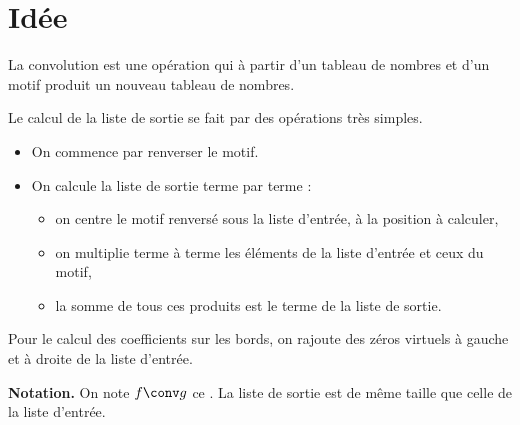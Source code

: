 \documentclass[11pt,class=report,crop=false]{standalone}
\begin{document}




\section{Idée}


La convolution est une opération qui à partir d'un tableau de nombres et d'un motif produit un nouveau tableau de nombres.



Le calcul de la liste de sortie se fait par des opérations très simples.
\begin{itemize}
  \item On commence par renverser le motif.
  
  \smallskip
  
  
  \item On calcule la liste de sortie terme par terme :
  \begin{itemize}
    \item on centre le motif renversé sous la liste d'entrée, à la position à calculer,
    \item on multiplie terme à terme les éléments de la liste d'entrée et ceux du motif,
    \item la somme de tous ces produits est le terme de la liste de sortie.
  \end{itemize}
\end{itemize}






Pour le calcul des coefficients sur les bords, on rajoute des zéros virtuels à gauche et à droite de la liste d'entrée.

\textbf{Notation.} On note $f \conv g$ ce . 
La liste de sortie est de même taille que celle de la liste d'entrée.
\end{document}
